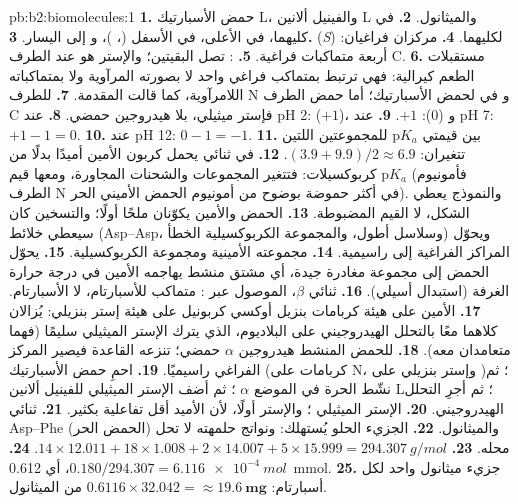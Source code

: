 \begin{solution}{pb:b2:biomolecules:1}
\textbf{1.} حمض الأسبارتيك L، والفينيل ألانين L والميثانول.
\textbf{2.} في كليهما،  في الأعلى،  في الأسفل (، )، و
إلى اليسار.
\textbf{3.} (\textit{S}) لكليهما.
\textbf{4.} مركزان فراغيان: أربعة متماكبات فراغية.
\textbf{5.} :  تصل
البقيتين؛ والإستر هو  عند الطرف C.
\textbf{6.} مستقبلات الطعم كيرالية: فهي ترتبط بمتماكب فراغي واحد لا بصورته المرآوية ولا
بمتماكباته اللامرآوية، كما قالت المقدمة.
\textbf{7.}  للطرف N و في  لحمض الأسبارتيك؛ أما حمض الطرف C
فإستر ميثيلي، بلا هيدروجين حمضي.
\textbf{8.} عند pH 2:  ($+1$)، و  (0): $+1$.
\textbf{9.} عند pH 7: $+1 - 1 = 0$.
\textbf{10.} عند pH 12: $0 - 1 = -1$.
\textbf{11.} بين قيمتي $\mathrm pK_a$ للمجموعتين اللتين تتغيران: $(3.9 + 9.9)/2 \approx 6.9$.
\textbf{12.} في ثنائي  يحمل كربون الأمين أميدًا بدلًا من كربوكسيلات: فتتغير
المجموعات والشحنات المجاورة، ومعها قيم $\mathrm pK_a$ (فأمونيوم الطرف N في
 أكثر حموضة بوضوح من أمونيوم الحمض الأميني الحر). والنموذج يعطي الشكل، لا
القيم المضبوطة.
\textbf{13.} الحمض والأمين يكوّنان ملحًا أولًا؛ والتسخين كان سيعطي خلائط (Asp--Asp، وسلاسل أطول،
والمجموعة الكربوكسيلية الخطأ) ويحوّل المراكز الفراغية إلى راسيمية.
\textbf{14.} مجموعته الأمينية ومجموعة  الكربوكسيلية.
\textbf{15.} يحوّل  الحمض إلى مجموعة مغادرة جيدة، أي مشتق منشط يهاجمه
الأمين في درجة حرارة الغرفة (استبدال أسيلي).
\textbf{16.} ثنائي  $\beta$، الموصول عبر : متماكب للأسبارتام، لا الأسبارتام.
\textbf{17.} الأمين على هيئة كربامات بنزيل أوكسي كربونيل  على هيئة إستر بنزيلي: يُزالان
كلاهما معًا بالتحلل الهيدروجيني على البلاديوم، الذي يترك الإستر الميثيلي سليمًا (فهما متعامدان
معه).
\textbf{18.} للحمض المنشط هيدروجين $\alpha$ حمضي؛ تنزعه القاعدة فيصير المركز الفراغي
راسيميًا.
\textbf{19.} احمِ حمض الأسبارتيك (كربامات على N، وإستر بنزيلي على )؛ ثم نشّط
 الحرة في الموضع $\alpha$ ؛ ثم أضف الإستر الميثيلي للفينيل ألانين L؛ ثم أجرِ التحلل الهيدروجيني.
\textbf{20.} الإستر الميثيلي ؛ والإستر أولًا، لأن الأميد أقل تفاعلية بكثير.
\textbf{21.} ثنائي  Asp--Phe (الحمض الحر) والميثانول.
\textbf{22.} الجزيء الحلو يُستهلك: ونواتج حلمهته لا تحل محله.
\textbf{23.} $14 \times 12.011 + 18 \times 1.008 + 2 \times 14.007 + 5 \times 15.999 =
\qty{294.307}{g/mol}$.
\textbf{24.} $0.180/294.307 = \qty{6.116e-4}{mol}$، أي \qty{0.612}{mmol}.
\textbf{25.} جزيء ميثانول واحد لكل أسبارتام: $0.6116 \times 32.042 = \boldsymbol{\approx \qty{19.6}{mg}}$ من
الميثانول.
\end{solution}
